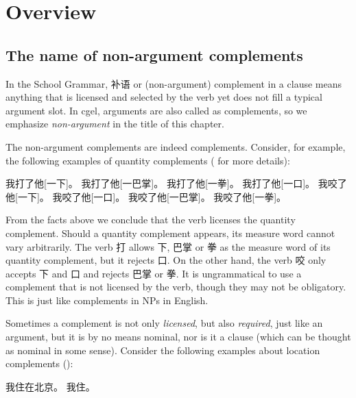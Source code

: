\documentclass[../main.tex]{subfiles}
\begin{document}

\section{Overview}

\subsection{The name of non-argument complements}

In the School Grammar, 补语 or (non-argument) complement in a clause means anything that is licensed and 
selected by the verb yet does not fill a typical argument slot. In \ac{cgel}, arguments are also called 
as complements, so we emphasize \emph{non-argument} in the title of this chapter. 

The non-argument complements are indeed complements. Consider, for example, the following examples
of quantity complements ( for more details):
\begin{exe}
    \ex \begin{xlist}
        \ex 我打了他[一下]。
        \ex 我打了他[一巴掌]。
        \ex 我打了他[一拳]。
        \ex *我打了他[一口]。
        \ex 我咬了他[一下]。
        \ex 我咬了他[一口]。
        \ex *我咬了他[一巴掌]。
        \ex *我咬了他[一拳]。
    \end{xlist}
\end{exe}
From the facts above we conclude that the verb licenses the quantity complement. Should a quantity
complement appears, its measure word cannot vary arbitrarily. The verb 打 allows 下, 巴掌 or 拳 as 
the measure word of its quantity complement, but it rejects 口. 
On the other hand, the verb 咬 only accepts 下 and 口 and rejects 巴掌 or 拳.
It is ungrammatical to use a complement that is not licensed by the verb, though they may not be 
obligatory. This is just like complements in NPs in English.

Sometimes a complement is not only \emph{licensed}, but also \emph{required}, just like an argument,
but it is by no means nominal, nor is it a clause (which can be thought as nominal in some sense). 
Consider the following examples about location complements ():
\begin{exe}
    \ex \begin{xlist}
        \ex 我住在北京。
        \ex *我住。
    \end{xlist}
\end{exe}
\end{document}
